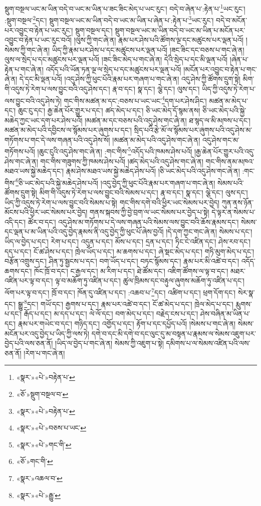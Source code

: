 སྡུག་བསྔལ་ཡང་མ་ཡིན་བདེ་བ་ཡང་མ་ཡིན་པ་ཟང་ཟིང་མེད་པ་ཡང་རུང་། བདེ་བ་ཞེན་པ་:རྟེན་པ་\footnote{«སྣར་»«པེ་»བརྟེན་པ་}ཡང་རུང་། :སྡུག་བསྔལ་\footnote{«ཅོ་»སྡུག་བསྔལ་བ་}དང་། སྡུག་བསྔལ་ཡང་མ་ཡིན་བདེ་བ་ཡང་མ་ཡིན་པ་ཞེན་པ་:རྟེན་པ་\footnote{«སྣར་»«པེ་»བརྟེན་པ་}ཡང་རུང་། བདེ་བ་མངོན་པར་འབྱུང་བ་རྟེན་པ་ཡང་རུང་། སྡུག་བསྔལ་དང་། སྡུག་བསྔལ་ཡང་མ་ཡིན་བདེ་བ་ཡང་མ་ཡིན་པ་མངོན་པར་འབྱུང་བ་རྟེན་པ་ཡང་རུང་བའོ། །ལུས་ཀྱི་གང་ཞེ་ན། རྣམ་པར་ཤེས་པའི་ཚོགས་ལྔ་དང་མཚུངས་པར་ལྡན་པའོ། །སེམས་ཀྱི་གང་ཞེ་ན། ཡིད་ཀྱི་རྣམ་པར་ཤེས་པ་དང་མཚུངས་པར་ལྡན་པའོ། །ཟང་ཟིང་དང་བཅས་པ་གང་ཞེ་ན། ལུས་ལ་སྲེད་པ་དང་མཚུངས་པར་ལྡན་པའོ། །ཟང་ཟིང་མེད་པ་གང་ཞེ་ན། དེའི་སྲེད་པ་དང་མི་ལྡན་པའོ། །ཞེན་པ་རྟེན་པ་གང་ཞེ་ན། འདོད་པའི་ཡོན་ཏན་ལྔ་ལ་སྲེད་པ་དང་མཚུངས་པར་ལྡན་པའོ། །མངོན་པར་འབྱུང་བ་རྟེན་པ་གང་ཞེ་ན། དེ་དང་མི་ལྡན་པའོ། །འདུ་ཤེས་ཀྱི་ཕུང་པོའི་རྣམ་པར་གཞག་པ་གང་ཞེ་ན། འདུ་ཤེས་ཀྱི་ཚོགས་དྲུག་སྟེ། མིག་གི་འདུས་ཏེ་རེག་པ་ལས་བྱུང་བའི་འདུ་ཤེས་དང་། རྣ་བ་དང་། སྣ་དང་། ལྕེ་དང་། ལུས་དང་། ཡིད་ཀྱི་འདུས་ཏེ་རེག་པ་ལས་བྱུང་བའི་འདུ་ཤེས་ཏེ། གང་གིས་མཚན་མ་དང་:བཅས་པ་ཡང་ཡང་\footnote{«སྣར་»«པེ་»བཅས་པ་ཡང་}དག་པར་ཤེས་ཤིང་། མཚན་མ་མེད་པ་དང་། ཆུང་ངུ་དང་། རྒྱ་ཆེན་པོར་གྱུར་པ་དང་། ཚད་མེད་པ་དང་། ཅི་ཡང་མེད་དོ་སྙམ་ནས། ཅི་ཡང་མེད་པའི་སྐྱེ་མཆེད་ཀྱང་ཡང་དག་པར་ཤེས་པའོ། །མཚན་མ་དང་བཅས་པའི་འདུ་ཤེས་གང་ཞེ་ན། ཐ་སྙད་ལ་མི་མཁས་པ་དང་། མཚན་མ་མེད་པའི་དབྱིངས་ལ་སྙོམས་པར་ཞུགས་པ་དང་། སྲིད་པའི་རྩེ་མོ་ལ་སྙོམས་པར་ཞུགས་པའི་འདུ་ཤེས་མ་གཏོགས་པ་གང་དེ་ལས་གཞན་པའི་འདུ་ཤེས་སོ། །མཚན་མ་མེད་པའི་འདུ་ཤེས་གང་ཞེ་ན། འདུ་ཤེས་གང་མ་གཏོགས་པའོ། །ཆུང་ངུའི་འདུ་ཤེས་གང་ཞེ་ན། :གང་གིས་\footnote{«སྣར་»«པེ་»གང་གི་}འདོད་པའི་ཁམས་ཤེས་པའོ། །རྒྱ་ཆེན་པོར་གྱུར་པའི་འདུ་ཤེས་གང་ཞེ་ན། གང་གིས་གཟུགས་ཀྱི་ཁམས་ཤེས་པའོ། །ཚད་མེད་པའི་འདུ་ཤེས་གང་ཞེ་ན། གང་གིས་ནམ་མཁའ་མཐའ་ཡས་སྐྱེ་མཆེད་དང་། རྣམ་ཤེས་མཐའ་ཡས་སྐྱེ་མཆེད་ཤེས་པའོ། །ཅི་ཡང་མེད་པའི་འདུ་ཤེས་གང་ཞེ་ན། :གང་གིས་\footnote{«ཅོ་»གང་གི་}ཅི་ཡང་མེད་པའི་སྐྱེ་མཆེད་ཤེས་པའོ། །འདུ་བྱེད་ཀྱི་ཕུང་པོའི་རྣམ་པར་གཞག་པ་གང་ཞེ་ན། སེམས་པའི་ཚོགས་དྲུག་སྟེ། མིག་གི་འདུས་ཏེ་རེག་པ་ལས་བྱུང་བའི་སེམས་པ་དང་། རྣ་བ་དང་། སྣ་དང་། ལྕེ་དང་། ལུས་དང་། ཡིད་ཀྱི་འདུས་ཏེ་རེག་པ་ལས་བྱུང་བའི་སེམས་པ་སྟེ། གང་གིས་དགེ་བའི་ཕྱིར་ཡང་སེམས་པར་བྱེད། ཀུན་ནས་ཉོན་མོངས་པའི་ཕྱིར་ཡང་སེམས་པར་བྱེད། གནས་སྐབས་ཀྱི་བྱེ་བྲག་ལ་ཡང་སེམས་པར་བྱེད་པ་སྟེ། དེ་ལྟར་ན་སེམས་པ་འདི་དང་། ཚོར་བ་དང་། འདུ་ཤེས་མ་གཏོགས་པ་དེ་ལས་གཞན་པའི་སེམས་ལས་བྱུང་བའི་ཆོས་རྣམས་དང་། སེམས་དང་ལྡན་པ་མ་ཡིན་པའི་འདུ་བྱེད་རྣམས་ནི་འདུ་བྱེད་ཀྱི་ཕུང་པོ་ཞེས་བྱའོ། །དེ་དག་ཀྱང་གང་ཞེ་ན། སེམས་པ་དང་། ཡིད་ལ་བྱེད་པ་དང་། རེག་པ་དང་། འདུན་པ་དང་། མོས་པ་དང་། དྲན་པ་དང་། ཏིང་ངེ་འཛིན་དང་། ཤེས་རབ་དང་། དད་པ་དང་། ངོ་ཚ་ཤེས་པ་དང་། ཁྲེལ་ཡོད་པ་དང་། མ་ཆགས་པ་དང་། ཞེ་སྡང་མེད་པ་དང་། གཏི་མུག་མེད་པ་དང་། བརྩོན་འགྲུས་དང་། ཤིན་ཏུ་སྦྱངས་པ་དང་། བག་ཡོད་པ་དང་། བཏང་སྙོམས་དང་། རྣམ་པར་མི་འཚེ་བ་དང་། འདོད་ཆགས་དང་། ཁོང་ཁྲོ་བ་དང་། ང་རྒྱལ་དང་། མ་རིག་པ་དང་། ཐེ་ཚོམ་དང་། འཇིག་ཚོགས་ལ་ལྟ་བ་དང་། མཐར་འཛིན་པར་ལྟ་བ་དང་། ལྟ་བ་མཆོག་ཏུ་འཛིན་པ་དང་། ཚུལ་ཁྲིམས་དང་བརྟུལ་ཞུགས་མཆོག་ཏུ་འཛིན་པ་དང་། ལོག་པར་ལྟ་བ་དང་། ཁྲོ་བ་དང་། ཁོན་དུ་འཛིན་པ་དང་། :འཆབ་པ་\footnote{«སྣར་»འཆལ་བ་}དང་། འཚིག་པ་དང་། ཕྲག་དོག་དང་། སེར་སྣ་དང་། སྒྱུ་\footnote{«སྣར་»«པེ་»རྒྱུ་}དང་། གཡོ་དང་། རྒྱགས་པ་དང་། རྣམ་པར་འཚེ་བ་དང་། ངོ་ཚ་མེད་པ་དང་། ཁྲེལ་མེད་པ་དང་། རྨུགས་པ་དང་། རྒོད་པ་དང་། མ་དད་པ་དང་། ལེ་ལོ་དང་། བག་མེད་པ་དང་། བརྗེད་ངས་པ་དང་། ཤེས་བཞིན་མ་ཡིན་པ་དང་། རྣམ་པར་གཡེང་བ་དང་། གཉིད་དང་། འགྱོད་པ་དང་། རྟོག་པ་དང་དཔྱོད་པའོ། །སེམས་པ་གང་ཞེ་ན། སེམས་མངོན་པར་འདུ་བྱེད་པ་ཡིད་ཀྱི་ལས་ཏེ། དགེ་བ་དང་མི་དགེ་བ་དང་ལུང་དུ་མ་བསྟན་པ་རྣམས་ལ་སེམས་འཇུག་པར་བྱེད་པའི་ལས་ཅན་ནོ། །ཡིད་ལ་བྱེད་པ་གང་ཞེ་ན། སེམས་ཀྱི་འཇུག་པ་སྟེ། དམིགས་པ་ལ་སེམས་འཛིན་པའི་ལས་ཅན་ནོ། །རེག་པ་གང་ཞེ་ན། 